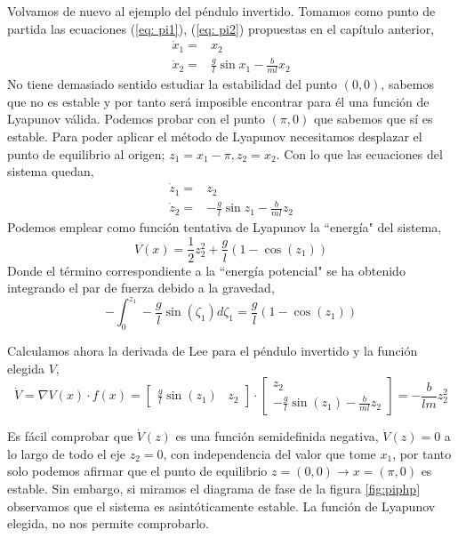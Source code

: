 \begin{example}
Volvamos de nuevo al ejemplo del péndulo invertido. Tomamos como punto de partida las ecuaciones (\ref{eq: pi1}), (\ref{eq: pi2}) propuestas en el capítulo anterior,
\begin{align*}
\dot x_1 = &x_2 \\ 
\dot x_2 = &\frac{g}{l}\sin x_1 - \frac{b}{ml}x_2 
\end{align*}
No tiene demasiado sentido estudiar la estabilidad del punto $(0,0)$, sabemos que no es estable y por tanto será imposible encontrar para él una función de Lyapunov válida. Podemos probar con el punto $(\pi,0)$ que sabemos que sí es estable. Para poder aplicar el método de Lyapunov necesitamos desplazar el punto de equilibrio al origen; $z_1=x_1-\pi,z_2=x_2$. Con lo que las ecuaciones del sistema quedan,
\begin{align*}
\dot z_1 = &z_2 \\ 
\dot z_2 = &-\frac{g}{l}\sin z_1 - \frac{b}{ml}z_2 
\end{align*}
Podemos emplear como función tentativa de Lyapunov la ``energía" del sistema,
\begin{equation*}
V(x) = \frac{1}{2}z_2^2 + \frac{g}{l}\left(1-\cos(z_1)\right)
\end{equation*}
Donde el término correspondiente a la ``energía potencial" se ha obtenido integrando el par de fuerza debido a la gravedad,
\begin{equation*}
-\int_0^{z_1}-\frac{g}{l}\sin(\zeta_1)d\zeta_1 =  \frac{g}{l}\left(1-\cos(z_1)\right)
\end{equation*}

Calculamos ahora la derivada de Lee para el péndulo invertido y la función elegida $V$,
\begin{equation*}
\dot V = \nabla V(x) \cdot f(x) = \begin{bmatrix}
\frac{g}{l}\sin(z_1) & z_2
\end{bmatrix} \cdot
\begin{bmatrix}
z_2\\
 -\frac{g}{l} \sin(z_1) - \frac{b}{ml}z_2 
\end{bmatrix}  = -\frac{b}{lm}z_2^2
\end{equation*}

Es fácil comprobar que $\dot V(z)$ es una función semidefinida negativa, $\dot V(z)=0$ a lo largo de todo el eje $z_2=0$, con independencia del valor que tome $x_1$, por tanto solo podemos afirmar que el punto de equilibrio $z=(0,0) \rightarrow x=(\pi,0)$ es estable. Sin embargo, si miramos el diagrama de fase de la figura \ref{fig:piphp} observamos que el sistema es asintóticamente estable. La función de Lyapunov elegida, no nos permite comprobarlo.


\end{example}
